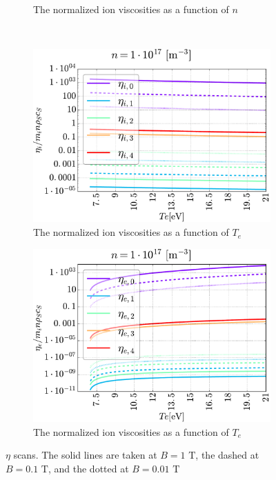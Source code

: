 \begin{figure}[t!]
\begin{subfigure}[t]{0.45\textwidth}
        \caption{The normalized ion viscosities as a function of $n$}
    \end{subfigure}
    \\
    \hfill
    \begin{subfigure}[t]{0.45\textwidth}
        \centering
        \includegraphics[width=1.0\textwidth]{fig/etaITScan}
        \caption{The normalized ion viscosities as a function of $T_e$}
    \end{subfigure}
    \hfill
    \begin{subfigure}[t]{0.45\textwidth}
        \centering
        \includegraphics[width=1.0\textwidth]{fig/etaETScan}
        \caption{The normalized ion viscosities as a function of $T_e$}
    \end{subfigure}
    \caption{$\eta$ scans. The solid lines are taken at $B=1\text{ T}$, the
        dashed at $B=0.1\text{ T}$, and the dotted at $B=0.01\text{ T}$}
    \label{fig:etas}
\end{figure}
